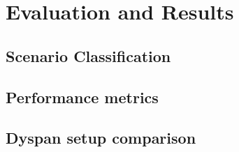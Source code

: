 \acresetall
\chapter{Evaluation and Results}\label{chapter:evaluation}\label{ch:evaluation}

\section{Scenario Classification}
\section{Performance metrics}
\section{Dyspan setup comparison}
